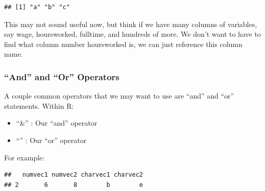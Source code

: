 \documentclass[
]{book}
\newenvironment{Shaded}{\begin{snugshade}}{\end{snugshade}}
\newcommand{\CommentTok}[1]{\textcolor[rgb]{0.56,0.35,0.01}{\textit{#1}}}
\newcommand{\DecValTok}[1]{\textcolor[rgb]{0.00,0.00,0.81}{#1}}
\newcommand{\NormalTok}[1]{#1}
\newcommand{\SpecialCharTok}[1]{\textcolor[rgb]{0.00,0.00,0.00}{#1}}
\providecommand{\tightlist}{%
  \setlength{\itemsep}{0pt}\setlength{\parskip}{0pt}}
\begin{document}
\begin{verbatim}
## [1] "a" "b" "c"
\end{verbatim}

This may not sound useful now, but think if we have many columns of variables, say wage, hoursworked, fulltime, and hundreds of more. We don't want to have to find what column number hoursworked is, we can just reference this column name.

\hypertarget{and-and-or-operators}{%
\subsubsection{``And'' and ``Or'' Operators}\label{and-and-or-operators}}

A couple common operators that we may want to use are ``and'' and ``or'' statements. Within R:

\begin{itemize}
\tightlist
\item
  ``\&'' : Our ``and'' operator
\item
  ``\textbar{}'' : Our ``or'' operator
\end{itemize}

For example:

\begin{Shaded}
\end{Shaded}

\begin{verbatim}
##   numvec1 numvec2 charvec1 charvec2
## 2       6       8        b        e
\end{verbatim}

\begin{Shaded}
\end{Shaded}
\end{document}
